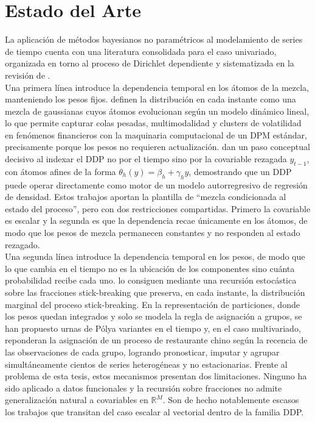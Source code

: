 \section{Estado del Arte}
\label{03_02_00_estado_arte}
 
La aplicación de métodos bayesianos no paramétricos al modelamiento de series de tiempo cuenta con una literatura consolidada para el caso univariado, organizada en torno al proceso de Dirichlet dependiente y sistematizada en la revisión de \citet{02_06_quintana2022dependent}.\\
 
Una primera línea introduce la dependencia temporal en los átomos de la mezcla, manteniendo los pesos fijos. \citet{03_01_rodriguez2008dynamic} definen la distribución en cada instante como una mezcla de gaussianas cuyos átomos evolucionan según un modelo dinámico lineal, lo que permite capturar colas pesadas, multimodalidad y clusters de volatilidad en fenómenos financieros con la maquinaria computacional de un DPM estándar, precisamente porque los pesos no requieren actualización. \citet{03_01_dilucca2013simple} dan un paso conceptual decisivo al indexar el DDP no por el tiempo sino por la covariable rezagada $y_{t-1}$, con átomos afines de la forma $\theta_h(y)=\beta_h+\gamma_h y$, demostrando que un DDP puede operar directamente como motor de un modelo autorregresivo de regresión de densidad. Estos trabajos aportan la plantilla de ``mezcla condicionada al estado del proceso'', pero con dos restricciones compartidas. Primero la covariable es escalar y la segunda es que la dependencia recae únicamente en los átomos, de modo que los pesos de mezcla permanecen constantes y no responden al estado rezagado.\\
 
Una segunda línea introduce la dependencia temporal en los pesos, de modo que lo que cambia en el tiempo no es la ubicación de los componentes sino cuánta probabilidad recibe cada uno. \citet{03_01_griffin2011stick} lo consiguen mediante una recursión estocástica sobre las fracciones stick-breaking que preserva, en cada instante, la distribución marginal del proceso stick-breaking. En la representación de particiones, donde los pesos quedan integrados y solo se modela la regla de asignación a grupos, se han propuesto urnas de Pólya variantes en el tiempo \cite{03_01_caron2007urna} y, en el caso multivariado, \citet{03_01_saad2018temporally} reponderan la asignación de un proceso de restaurante chino según la recencia de las observaciones de cada grupo, logrando pronosticar, imputar y agrupar simultáneamente cientos de series heterogéneas y no estacionarias. Frente al problema de esta tesis, estos mecanismos presentan dos limitaciones. Ninguno ha sido aplicado a datos funcionales y la recursión sobre fracciones no admite generalización natural a covariables en $\mathbb{R}^M$. Son de hecho notablemente escasos los trabajos que transitan del caso escalar al vectorial dentro de la familia DDP.\\
 
